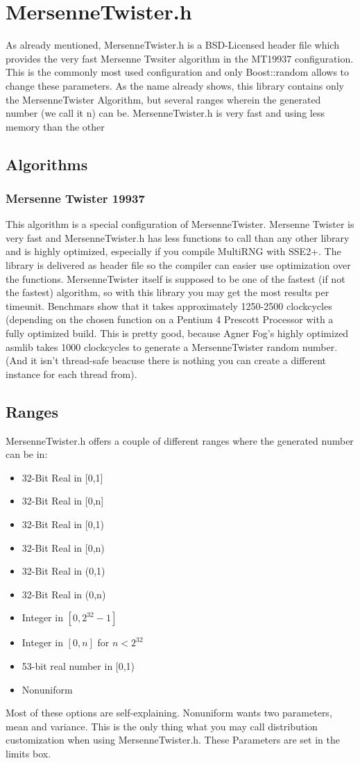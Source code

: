 \documentclass{scrartcl}
\begin{document}
\section{MersenneTwister.h}
As already mentioned, MersenneTwister.h is a BSD-Licensed header file which provides the very fast Mersenne Twsiter algorithm in the MT19937 configuration. This is the commonly most used configuration and only Boost::random allows to change these parameters. As the name already shows, this library contains only the MersenneTwister Algorithm, but several ranges wherein the generated number (we call it n) can be. MersenneTwister.h is very fast and using less memory than the other 
\subsection{Algorithms}
\subsubsection{Mersenne Twister 19937}
This algorithm is a special configuration of MersenneTwister. Mersenne Twister is very fast and MersenneTwister.h has less functions to call than any other library and is highly optimized, especially if you compile MultiRNG with SSE2+. The library is delivered as header file so the compiler can easier use optimization over the functions. MersenneTwister itself is supposed to be one of the fastest (if not the fastest) algorithm, so with this library you may get the most results per timeunit. Benchmars show that it takes approximately 1250-2500 clockcycles (depending on the chosen function on a Pentium 4 Prescott Processor with a fully optimized build. This is pretty good, because Agner Fog's highly optimized asmlib takes 1000 clockcycles to generate a MersenneTwister random number. (And it isn't thread-safe beacuse there is nothing you can create a different instance for each thread from).
\subsection{Ranges}
MersenneTwister.h offers a couple of different ranges where the generated number can be in:
\begin{itemize}
	\item 32-Bit Real in [0,1]
	\item 32-Bit Real in [0,n]
	\item 32-Bit Real in [0,1)
	\item 32-Bit Real in [0,n)
	\item 32-Bit Real in (0,1)
	\item 32-Bit Real in (0,n)
	\item Integer in $[0,2^32-1]$
	\item Integer in $[0,n]$ for $n<2^{32}$
	\item 53-bit real number in [0,1)
	\item Nonuniform
\end{itemize}
Most of these options are self-explaining. Nonuniform wants two parameters, mean and variance. This is the only thing what you may call distribution customization when using MersenneTwister.h. These Parameters are set in the limits box.
\end{document}
